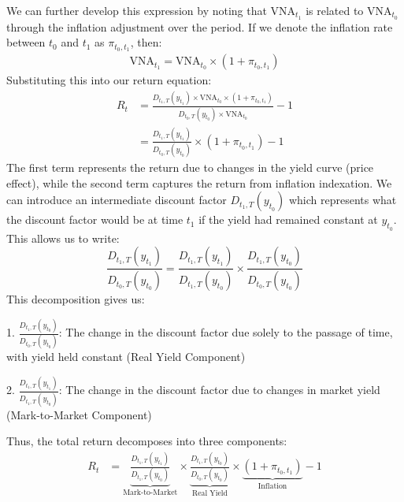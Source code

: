 \documentclass[10pt]{report}
\begin{document}
We can further develop this expression by noting that $\text{VNA}_{t_1}$ is related to $\text{VNA}_{t_0}$ through the inflation adjustment over the period. If we denote the inflation rate between $t_0$ and $t_1$ as $\pi_{t_0,t_1}$, then:
\begin{align*}
	\text{VNA}_{t_1} = \text{VNA}_{t_0} \times (1 + \pi_{t_0,t_1})
\end{align*}
Substituting this into our return equation:
\begin{align*}
	R_{t} & = \frac{D_{t_1,T}(y_{t_1}) \times \text{VNA}_{t_0} \times (1 + \pi_{t_0,t_1})}{D_{t_0,T}(y_{t_0}) \times \text{VNA}_{t_0}} -1 \\
	      & = \frac{D_{t_1,T}(y_{t_1})}{D_{t_0,T}(y_{t_0})} \times (1 + \pi_{t_0,t_1}) -1
\end{align*}
The first term represents the return due to changes in the yield curve (price effect), while the second term captures the return from inflation indexation. We can introduce an intermediate discount factor $D_{t_1,T}(y_{t_0})$ which represents what the discount factor would be at time $t_1$ if the yield had remained constant at $y_{t_0}$. This allows us to write:
$$\frac{D_{t_1,T}(y_{t_1})}{D_{t_0,T}(y_{t_0})} = \frac{D_{t_1,T}(y_{t_1})}{D_{t_1,T}(y_{t_0})} \times \frac{D_{t_1,T}(y_{t_0})}{D_{t_0,T}(y_{t_0})}$$
This decomposition gives us:

1. $\frac{D_{t_1,T}(y_{t_0})}{D_{t_0,T}(y_{t_0})}$: The change in the discount factor due solely to the passage of time, with yield held constant (Real Yield Component)

2. $\frac{D_{t_1,T}(y_{t_1})}{D_{t_1,T}(y_{t_0})}$: The change in the discount factor due to changes in market yield (Mark-to-Market Component)

Thus, the total return decomposes into three components:
\begin{align}
	R_{t} & = \underbrace{\frac{D_{t_1,T}(y_{t_1})}{D_{t_1,T}(y_{t_0})}}_{\text{Mark-to-Market}} \times \underbrace{\frac{D_{t_1,T}(y_{t_0})}{D_{t_0,T}(y_{t_0})}}_{\text{Real Yield}} \times \underbrace{(1 + \pi_{t_0,t_1})}_{\text{Inflation}} - 1
\end{align}
\end{document}

